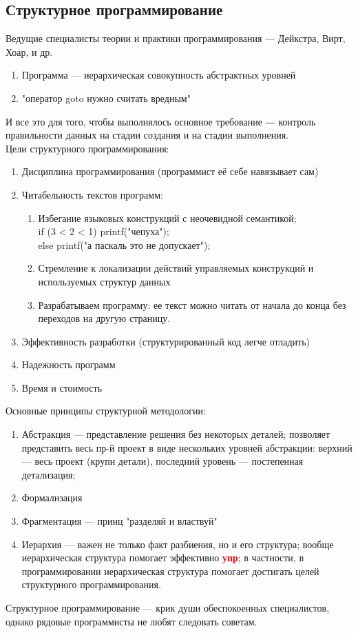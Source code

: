 \documentclass[main]{subfiles}
\begin{document}
    \subsection{Структурное программирование}
    Ведущие специалисты теории и практики программирования — Дейкстра, Вирт, Хоар, и др.
    \begin{enumerate}
        \item Программа — иерархическая совокупность абстрактных уровней
        \item "оператор goto нужно считать вредным"{}
    \end{enumerate}
    И все это для того, чтобы выполнялось основное требование ― контроль правильности данных на стадии создания и на стадии выполнения.\\

    Цели структурного программирования:
    \begin{enumerate}
        \item Дисциплина программирования (программист её себе навязывает сам)
        \item Читабельность текстов программ:
        \begin{enumerate}
            \item Избегание языковых конструкций с неочевидной семантикой;\\
            {if (3 < 2 < 1) printf("чепуха"{}); \\
            else printf("а паскаль это не допускает"{});}
            \item Стремление к локализации действий управляемых конструкций и используемых структур данных
            \item Разрабатываем программу: ее текст можно читать от начала до конца без переходов на другую страницу.
        \end{enumerate}
        \item Эффективность разработки (структурированный код легче отладить)
        \item Надежность программ
        \item Время и стоимость
    \end{enumerate}

    Основные принципы структурной методологии:
    \begin{enumerate}
        \item Абстракция --- представление решения без некоторых деталей; позволяет представить весь пр-й проект в виде нескольких уровней абстракции: верхний --- весь проект (крупн детали), последний уровень --- постепенная детализация;
        \item Формализация
        \item Фрагментация --- принц "разделяй и властвуй"{}
        \item Иерархия --- важен не только факт разбиения, но и его структура; вообще иерархическая структура помогает эффективно \textbf{\textcolor{red}{упр}}; в частности, в программировании иерархическая структура помогает достигать целей структурного программирования.
    \end{enumerate}
    Структурное программирование --- крик души обеспокоенных специалистов, однако рядовые программисты не любят следовать советам.\\
\end{document}
